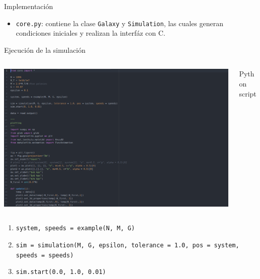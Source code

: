 \documentclass{beamer}
\begin{document}
\begin{frame}{Implementaci\'on}
	\begin{tcolorbox}[colback=blue!5,colframe=blue!40!black,title=Python]
		\begin{itemize}
			\item \texttt{core.py}: contiene la clase \texttt{Galaxy} y \texttt{Simulation}, las cuales generan condiciones iniciales y realizan la interf\'az con C.
		\end{itemize}
	\end{tcolorbox}
\end{frame}
\begin{frame}{Ejecuci\'on de la simulaci\'on}
	\begin{columns}
		\begin{column}{0.75\textwidth}
			\includegraphics[height=0.5\textheight]{sources/images/code.png}
		\end{column}
		\begin{column}{0.25\textwidth}
			Python script
		\end{column}
	\end{columns}
	\begin{enumerate}
		\item \texttt{system, speeds = example(N, M, G)} \pause
		\item {\footnotesize\texttt{sim = simulation(M, G, epsilon, tolerance = 1.0, pos = system, speeds = speeds)}} \pause
		\item \texttt{sim.start(0.0, 1.0, 0.01)}
	\end{enumerate}
\end{frame}
\end{document}
